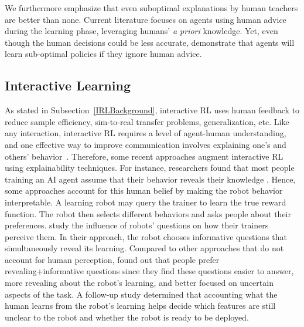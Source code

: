 \documentclass[twoside,11pt]{article}
\begin{document}
We furthermore emphasize that even suboptimal explanations by human teachers are better than none. Current literature focuses on agents using human advice during the learning phase, leveraging humans' \emph{a priori} knowledge. Yet, even though the human decisions could be less accurate, \cite{Zhang:2020:human_out_loop} demonstrate that agents will learn sub-optimal policies if they ignore human advice. 

\subsection{Interactive Learning}
As stated in Subsection~\ref{IRLBackground}, interactive RL uses human feedback to reduce sample efficiency, sim-to-real transfer problems, generalization, etc. Like any interaction, interactive RL requires a level of agent-human understanding, and one effective way to improve communication involves explaining one's and others' behavior~\citep{de:17}. Therefore, some recent approaches augment interactive RL using explainability techniques. For instance, researchers found that most people training an AI agent assume that their behavior reveals their knowledge \citep{habibian:21}. Hence, some approaches account for this human belief by making the robot behavior interpretable. A learning robot may query the trainer to learn the true reward function. The robot then selects different behaviors and asks people about their preferences. \cite{habibian:21} study the influence of robots' questions on how their trainers perceive them. In their approach, the robot chooses informative questions that simultaneously reveal its learning. Compared to other approaches that do not account for human perception, \cite{habibian:21} found out that people prefer revealing+informative questions since they find these questions easier to answer, more revealing about the robot's learning, and better focused on uncertain aspects of the task. A follow-up study determined that accounting what the human learns from the robot's learning helps decide which features are still unclear to the robot and whether the robot is ready to be deployed. 
\end{document}
